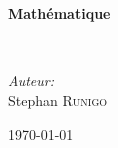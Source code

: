 \begin{titlepage}
%
~\\[1cm]

\begin{center}
\end{center}

\textsc{\Large }\\[0.5cm]

\HRule

\begin{center}
{\huge \bfseries  Mathématique\\
 }
\end{center}

\HRule \\[1.5cm]

\vfill

\begin{minipage}{0.4\textwidth}
\begin{flushleft} \large
\end{flushleft}
\end{minipage}
\begin{minipage}{0.4\textwidth}
\begin{flushright} \large
\emph{Auteur:}\\
Stephan \textsc{Runigo}
\end{flushright}
\end{minipage}

\vfill

{\large \today}

\end{titlepage}
